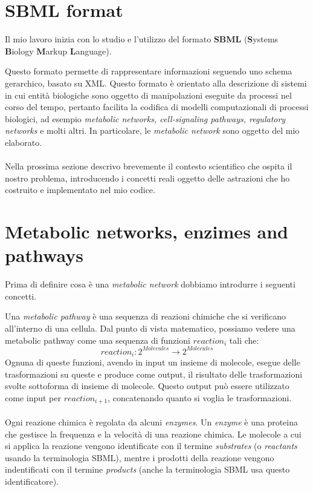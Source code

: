 
\section{SBML format}
Il mio lavoro inizia con lo studio e l'utilizzo del formato
\textbf{SBML} (\textbf{S}ystems \textbf{B}iology \textbf{M}arkup 
\textbf{L}anguage). 

Questo formato permette di rappresentare informazioni seguendo uno
schema gerarchico, basato su XML. Questo formato \`e orientato alla
descrizione di sistemi in cui entit\`a biologiche sono oggetto di
manipolazioni eseguite da processi nel corso del tempo, pertanto
facilita la codifica di modelli computazionali di processi biologici,
ad esempio \emph{metabolic networks, cell-signaling pathways,
  regulatory networks} e molti altri. In particolare, le
\emph{metabolic network} sono oggetto del mio elaborato.
\\\\
Nella prossima sezione descrivo brevemente il contesto scientifico che
ospita il nostro problema, introducendo i concetti reali oggetto delle
astrazioni che ho costruito e implementato nel mio codice.

\section{Metabolic networks, enzimes and pathways}

Prima di definire cosa \`e una \emph{metabolic network} dobbiamo
introdurre i seguenti concetti.

Una \emph{metabolic pathway} \`e una sequenza di reazioni chimiche che
si verificano all'interno di una cellula. Dal punto di vista
matematico, possiamo vedere una metabolic pathway come una sequenza di
funzioni $reaction_{i}$ tali che:
\begin{displaymath}
reaction_{i} : 2^{Molecules} \rightarrow 2^{Molecules}
\end{displaymath}
Ognuna di queste funzioni, avendo in input un insieme di molecole,
esegue delle trasformazioni su queste e produce come output, il
risultato delle trasformazioni svolte sottoforma di insieme di
molecole. Questo output pu\`o essere utilizzato come input per
$reaction_{i+1}$, concatenando quanto si voglia le trasformazioni.
\\\\
Ogni reazione chimica \`e regolata da alcuni \emph{enzymes}. Un
\emph{enzyme} \`e una proteina che gestisce la frequenza e la
velocit\`a di una reazione chimica. Le molecole a cui si applica la
reazione vengono identificate con il termine \emph{substrates} (o
\emph{reactants} usando la terminologia SBML), mentre i prodotti della
reazione vengono indentificati con il termine \emph{products} (anche
la terminologia SBML usa questo identificatore).


